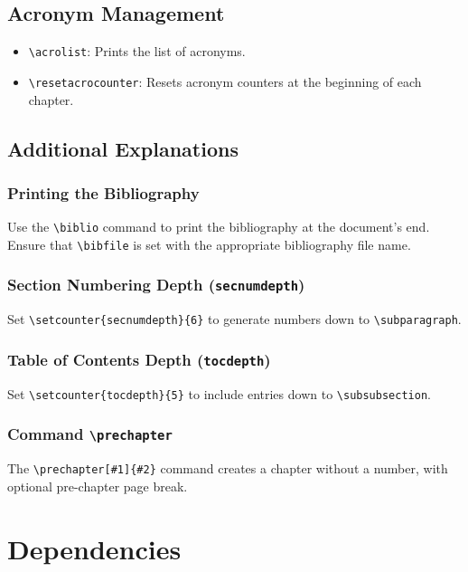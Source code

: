 \documentclass[12pt,twoside]{report}
\begin{document}
\section{Acronym Management}
\begin{itemize}
    \item \verb|\acrolist|: Prints the list of acronyms.
    \item \verb|\resetacrocounter|: Resets acronym counters at the beginning of each chapter.
\end{itemize}

\section{Additional Explanations}

\subsection{Printing the Bibliography}
Use the \verb|\biblio| command to print the bibliography at the document's end. Ensure that \verb|\bibfile| is set with the appropriate bibliography file name.

\subsection{Section Numbering Depth (\texttt{secnumdepth})}
Set \verb|\setcounter{secnumdepth}{6}| to generate numbers down to \verb|\subparagraph|.

\subsection{Table of Contents Depth (\texttt{tocdepth})}
Set \verb|\setcounter{tocdepth}{5}| to include entries down to \verb|\subsubsection|.

\subsection{Command \texttt{\textbackslash prechapter}}
The \verb|\prechapter[#1]{#2}| command creates a chapter without a number, with optional pre-chapter page break.

\chapter{Dependencies}
\end{document}
